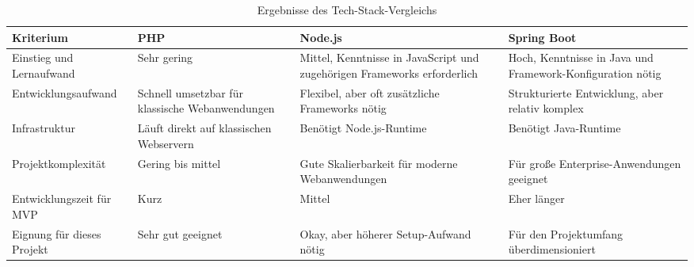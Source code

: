 \begin{table}[htbp]
\centering
\small
\begin{tabularx}{\textwidth}{lXXX}
\toprule
Kriterium & PHP & Node.js & Spring Boot \\
\midrule
Einstieg und Lernaufwand
& Sehr gering
& Mittel, Kenntnisse in JavaScript und zugehörigen Frameworks erforderlich
& Hoch, Kenntnisse in Java und Framework-Konfiguration nötig \\

Entwicklungsaufwand
& Schnell umsetzbar für klassische Webanwendungen
& Flexibel, aber oft zusätzliche Frameworks nötig
& Strukturierte Entwicklung, aber relativ komplex \\

Infrastruktur
& Läuft direkt auf klassischen Webservern
& Benötigt Node.js-Runtime
& Benötigt Java-Runtime \\

Projektkomplexität
& Gering bis mittel
& Gute Skalierbarkeit für moderne Webanwendungen
& Für große Enterprise-Anwendungen geeignet \\

Entwicklungszeit für MVP
& Kurz
& Mittel
& Eher länger \\

Eignung für dieses Projekt
& Sehr gut geeignet
& Okay, aber höherer Setup-Aufwand nötig
& Für den Projektumfang überdimensioniert \\
\bottomrule
\end{tabularx}
\caption{Ergebnisse des Tech-Stack-Vergleichs}
\label{tab:vglBackend}
\end{table}
